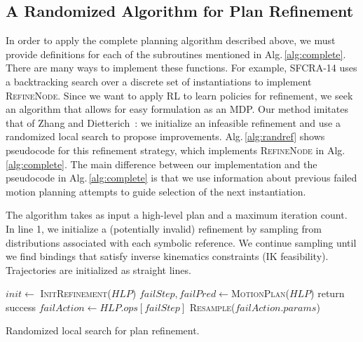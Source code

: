 \subsection{A Randomized Algorithm for Plan Refinement}
In order to apply the complete planning algorithm described above, we must provide definitions for each of the subroutines mentioned in Alg.\,\ref{alg:complete}. There are many ways to implement these functions. For example, SFCRA-14 uses a backtracking search over a discrete set of instantiations to implement \textsc{RefineNode}. Since we want to apply RL to learn policies for refinement,
we seek an algorithm that allows for easy formulation as an MDP. Our method
imitates that of Zhang and Dietterich~\cite{JobShopSched}:
we initialize an infeasible refinement and use a randomized local search to propose
improvements. Alg.\,\ref{alg:randref} shows pseudocode for this refinement strategy,
which implements \textsc{RefineNode} in Alg.\,\ref{alg:complete}. The main difference between our implementation and the pseudocode in Alg.\,\ref{alg:complete} is that we use information about previous failed motion planning attempts to guide selection of the next instantiation.

The algorithm takes as input a high-level plan and a maximum iteration count.
In line 1, we initialize a (potentially invalid) refinement by sampling from distributions associated
with each symbolic reference. We continue sampling
until we find bindings that satisfy inverse kinematics constraints (IK feasibility). Trajectories are
initialized as straight lines.

\begin{algorithm}[t]
\begin{small}
  \SetAlgoLined
  \DontPrintSemicolon
   {
  \nl $init \leftarrow$ \textsc{InitRefinement}($HLP$)\;
  \nl {} {
  \nl $failStep, failPred \leftarrow $\textsc{MotionPlan}($HLP$)\;
  \nl {} {
  \nl return success }
  \nl {} {
  \nl $failAction \leftarrow HLP.ops[failStep]$\;
  \nl \textsc{Resample}($failAction.params$) }
  \nl {} }}

\end{small}
\caption{Randomized local search for plan refinement.}
\label{alg:randref}
\end{algorithm}

